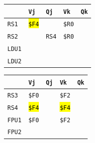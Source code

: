 \begin{enumerate}
    \begin{minipage}{0.45\textwidth}
        \centering
        \begin{tabular}{@{} l | l l l l @{}}
            \toprule
                & \texttt{Vj} & \texttt{Qj} & \texttt{Vk} & \texttt{Qk} \\
            \midrule
            \texttt{RS1} & \hl{\texttt{\$F4}} & & \texttt{\$R0} & \\ [.3em]
            \texttt{RS2} & & \texttt{RS4} & \texttt{\$R0} & \\
            \cmidrule{1-5}
            \texttt{LDU1} & & & & \\ [.3em]
            \texttt{LDU2} & & & & \\
            \bottomrule
        \end{tabular}
    \end{minipage}
    \hfill
    \begin{minipage}{0.45\textwidth}
        \centering
        \begin{tabular}{@{} l | l l l l @{}}
            \toprule
            & \texttt{Vj} & \texttt{Qj} & \texttt{Vk} & \texttt{Qk} \\
            \midrule
            \texttt{RS3} & \texttt{\$F0} & & \texttt{\$F2} & \\ [.3em]
            \texttt{RS4} & \hl{\texttt{\$F4}} & & \hl{\texttt{\$F4}} & \\
            \cmidrule{1-5}
            \texttt{FPU1} & \texttt{\$F0} & & \texttt{\$F2} & \\ [.3em]
            \texttt{FPU2} & & & & \\
            \bottomrule
        \end{tabular}
    \end{minipage}


\end{enumerate}
